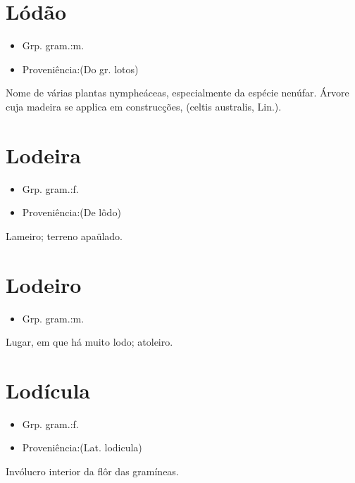 \section{Lódão}
\begin{itemize}
\item {Grp. gram.:m.}
\end{itemize}
\begin{itemize}
\item {Proveniência:(Do gr. \textunderscore lotos\textunderscore )}
\end{itemize}
Nome de várias plantas nympheáceas, especialmente da espécie nenúfar.
Árvore cuja madeira se applica em construcções, (\textunderscore celtis australis\textunderscore , Lin.).
\section{Lodeira}
\begin{itemize}
\item {Grp. gram.:f.}
\end{itemize}
\begin{itemize}
\item {Proveniência:(De \textunderscore lôdo\textunderscore )}
\end{itemize}
Lameiro; terreno apaülado.
\section{Lodeiro}
\begin{itemize}
\item {Grp. gram.:m.}
\end{itemize}
Lugar, em que há muito lodo; atoleiro.
\section{Lodícula}
\begin{itemize}
\item {Grp. gram.:f.}
\end{itemize}
\begin{itemize}
\item {Proveniência:(Lat. \textunderscore lodicula\textunderscore )}
\end{itemize}
Invólucro interior da flôr das gramíneas.
